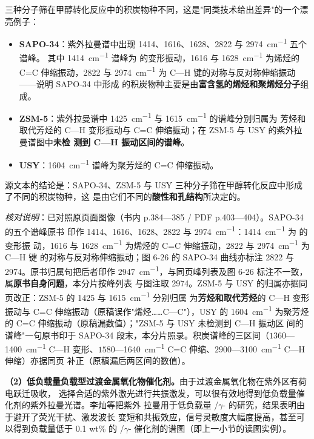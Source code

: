 三种分子筛在甲醇转化反应中的积炭物种不同，这是"同类技术给出差异"的一个漂亮例子：
\begin{itemize}
\item \textbf{SAPO-34}：紫外拉曼谱中出现 1414、1616、1628、2822 与 \qty{2974}{cm^{-1}} 五个谱峰。
  其中 \qty{1414}{cm^{-1}} 谱峰为  的变形振动，1616 与 \qty{1628}{cm^{-1}} 为烯烃的 C=C
  伸缩振动，2822 与 \qty{2974}{cm^{-1}} 为 C—H 键的对称与反对称伸缩振动——说明 SAPO-34 中形成
  的积炭物种主要是由\textbf{富含氢的烯烃和聚烯烃分子}组成。
\item \textbf{ZSM-5}：紫外拉曼谱中 \qty{1425}{cm^{-1}} 与 \qty{1615}{cm^{-1}} 的谱峰分别归属为
  芳烃和取代芳烃的 C—H 变形振动与 C=C 伸缩振动；在 ZSM-5 与 USY 的紫外拉曼谱图中\textbf{未检
  测到 C—H 振动区间的谱峰}。
\item \textbf{USY}：\qty{1604}{cm^{-1}} 谱峰为聚芳烃的 C=C 伸缩振动。
\end{itemize}
源文本的结论是：SAPO-34、ZSM-5 与 USY 三种分子筛在甲醇转化反应中形成了不同的积炭物种，这
是由它们不同的\textbf{酸性和孔结构}所决定的。

\emph{核对说明}：已对照原页面图像（书内 p.384—385 / PDF p.403—404）。SAPO-34 的五个谱峰原书
印作 1414、1616、1628、2822 与 \qty{2974}{cm^{-1}}：\qty{1414}{cm^{-1}} 为  的变形振
动，1616 与 \qty{1628}{cm^{-1}} 为烯烃的 C=C 伸缩振动，2822 与 \qty{2974}{cm^{-1}} 为 C—H 键
的对称与反对称伸缩振动；图 6-26 的 SAPO-34 曲线亦标注 2822 与 2974。原书归属句把后者印作
\qty{2947}{cm^{-1}}，与同页峰列表及图 6-26 标注不一致，属\textbf{原书自身问题}，本分片按峰列表
与图注取 2974。ZSM-5 与 USY 的归属亦据同页改正：ZSM-5 的 1425 与 \qty{1615}{cm^{-1}} 分别归属
为\textbf{芳烃和取代芳烃}的 C—H 变形振动与 C=C 伸缩振动（原稿误作"烯烃……C—C"），USY 的
\qty{1604}{cm^{-1}} 为聚芳烃的 C=C 伸缩振动（原稿漏数值）；"ZSM-5 与 USY 未检测到 C—H 振动区
间的谱峰"一句原书印于 SAPO-34 段末，本分片照录。积炭谱峰的三区间（$1360$—\qty{1400}{cm^{-1}}
C—H 变形、$1580$—\qty{1640}{cm^{-1}} C=C 伸缩、$2900$—\qty{3100}{cm^{-1}} C—H 伸缩）亦据同页
补正（原稿漏后两区间的数值）。

\textbf{（2）低负载量负载型过渡金属氧化物催化剂。}由于过渡金属氧化物在紫外区有荷电跃迁吸收，
选择合适的紫外激光进行共振激发，可以很有效地得到低负载量催化剂的紫外拉曼光谱。李灿等把紫外
拉曼用于低负载量 /$\gamma$- 的研究，结果表明由于避开了荧光干扰、激发波长
变短和共振效应，信号灵敏度大幅度提高，甚至可以得到负载量低于 \num{0.1} wt\% 的
/$\gamma$- 催化剂的谱图（即上一小节的读图实例）。

